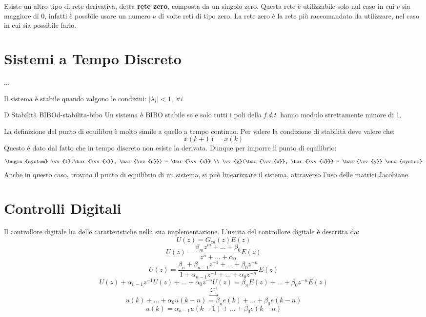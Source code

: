 \documentclass[12pt]{article}
\begin{document}
Esiste un altro tipo di rete derivativa, detta \textbf{rete zero}, composta da un singolo zero. Questa rete \`e utilizzabile solo nul caso in cui $\nu$ sia maggiore di 0, infatti \`e possbile usare un numero $\nu$ di volte reti di tipo zero. La rete zero \`e la rete pi\`u raccomandata da utilizzare, nel caso in cui sia possibile farlo.



\newpage
\section{Sistemi a Tempo Discreto}

...

Il sistema \`e stabile quando valgono le condizini: $|\lambda_i| < 1,\; \forall i$

\begin{definition}{D Stabilit\`a BIBO}{d-stabilita-bibo}
    Un sistema \`e BIBO stabile se e solo tutti i poli della \emph{f.d.t.} hanno modulo strettamente minore di 1.
\end{definition}

La definizione del punto di equilibro \`e molto simile a quello a tempo continuo. Per valere la condizione di stabilit\`a deve valere che:
\[ \boxed{x(k+1) = x(k)} \]
Questo \`e dato dal fatto che in tempo discreto non esiste la derivata.
Dunque per imporre il punto di equilibrio:
\[ \begin{system} 
\vv{f}(\bar{\vv{x}}, \bar{\vv{u}}) = \bar{\vv{x}} \\
\vv{g}(\bar{\vv{x}}, \bar{\vv{u}}) = \bar{\vv{y}}
\end{system}  \]
Anche in questo caso, trovato il punto di equilibrio di un sistema, si pu\`o linearizzare il sistema, attraverso l'uso delle matrici Jacobiane.




\newpage
\section{Controlli Digitali}
Il controllore digitale ha delle caratteristiche nella sua implementazione. L'uscita del controllore digitale \`e descritta da:
\[ U(z) = G_{cd}(z) E(z) \]
\[ U(z) = \frac{\beta_mz^{m}+\dots + \beta_0}{z^{n} +\dots+ \alpha_0}E(z)  \]
\[ U(z) = \frac{\beta_n + \beta_{n-1}z^{-1} + \dots + \beta_0z^{-n}}{1 + \alpha_{n-1}z^{-1} + \dots + \alpha_0z^{-n}} E(z) \]
\[ U(z) + \alpha_{n-1}z^{-1} U(z) + \dots + \alpha_0z^{-n}U(z) = \beta_nE(z) + \dots + \beta_0z^{-n}E(z) \]
\[ \overset{\mathcal{Z}^{-1}}{\longrightarrow} \]
\[ u(k) + \dots + \alpha_0 u(k-n) = \beta_n e(k) + \dots + \beta_0e(k-n) \]
\[ u(k) = \alpha_{n-1}u(k-1) + \dots + \beta_0 e(k-n) \]
\end{document}
